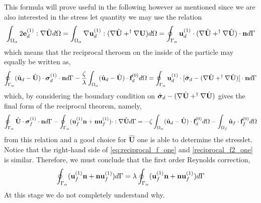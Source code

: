 This formula will prove useful in the following however as mentioned since we are also interested in the stress let quantity we may use the relation 
\begin{align*}
    \int_{\Omega_{\alpha}}  2\textbf{e}_d^{(1)} : \mathbf{\nabla} \hat{\textbf{U}}  d\Omega
    &=\int_{\Omega_{\alpha}}  \mathbf{\nabla} \textbf{u}_d^{(1)} : (\mathbf{\nabla} \hat{\textbf{U}} +^\dagger \mathbf{\nabla} \textbf{U})  d\Omega
    =
    \oint_{\Gamma_{\alpha}}   \textbf{u}_d^{(1)} \cdot (\mathbf{\nabla} \hat{\textbf{U}} + ^\dagger\mathbf{\nabla} \hat{\textbf{U}})  \cdot \textbf{n} d\Gamma\\
\end{align*}
which means that the reciprocal theroem on the inside of the particle may equally be written as, 
\begin{equation*}
    \oint_{\Gamma_{\alpha}}  (\hat{\textbf{u}}_d - \hat{\textbf{U}})\cdot \bm\sigma_d^{(1)} \cdot \textbf{n} d\Gamma
    - \frac{\zeta}{\lambda} \int_{\Omega_{\alpha}} (\hat{\textbf{u}}_d - \hat{\textbf{U}}) \cdot \textbf{f}_d^{(0)} d\Omega
    =
    \oint_{\Gamma_{\alpha}} 
         \textbf{u}_d^{(1)}\cdot[\hat{\bm\sigma}_d  - (\mathbf{\nabla} \hat{\textbf{U}} + ^\dagger\mathbf{\nabla} \hat{\textbf{U}})]\cdot \textbf{n}
     d\Gamma
\end{equation*}
which, by considering the boundary condition on $\hat{\bm\sigma}_d  - (\mathbf{\nabla} \hat{\textbf{U}} + ^\dagger\mathbf{\nabla} \hat{\textbf{U}})$ gives the final form of the reciprocal theorem, namely, 
\begin{equation*}
    \oint_{\Gamma_{\alpha}} \hat{\textbf{U}}\cdot  \bm\sigma_f^{(1)} \cdot \textbf{n} d\Gamma
    - \oint_{\Gamma_{\alpha}} (\textbf{u}_f^{(1)} \textbf{n} + \textbf{n} \textbf{u}_f^{(1)})\cdot :\mathbf{\nabla} \hat{\textbf{U}}  d\Gamma
    = 
    - \zeta \int_{\Omega_{\alpha}} (\hat{\textbf{u}}_d - \hat{\textbf{U}}) \cdot \textbf{f}_d^{(0)} d\Omega
    - \int_{\Omega_f} \hat{\textbf{u}}_f\cdot  \textbf{f}^{(0)}_f d\Omega
    \label{eq:reciprocal_f2_one}
\end{equation*}
from this relation and a good choice for $\hat{\textbf{U}}$ one is able to determine the stresslet. 
Notice that the right-hand side of \ref{eq:reciprocal_f_one} and \ref{reciprocal_f2_one} is similar. 
Therefore, we must conclude that the first order Reynolds correction,
\begin{equation*}
    \oint_{\Gamma_{\alpha}} (\textbf{u}_f^{(1)} \textbf{n} + \textbf{n} \textbf{u}_f^{(1)}) d\Gamma
    = \lambda \oint_{\Gamma_{\alpha}} (\textbf{u}_f^{(1)} \textbf{n} + \textbf{n} \textbf{u}_f^{(1)}) d\Gamma
\end{equation*}
At this stage we do not completely understand why. 


